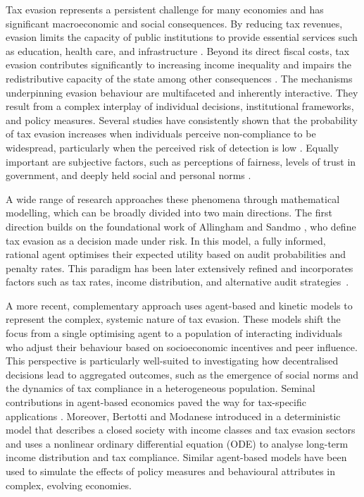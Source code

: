 \documentclass[11pt]{article}
\theoremstyle{plain}
\theoremstyle{definition}
\newcommand{\1}{\mathbf{1}}
\begin{document}
Tax evasion represents a persistent challenge for many economies and has significant macroeconomic and social consequences. By reducing tax revenues, evasion limits the capacity of public institutions to provide essential services such as education, health care, and infrastructure \mbox{\cite{chetty2009taxable, feldstein1995effect}}. Beyond its direct fiscal costs, tax evasion contributes significantly to increasing income inequality and impairs the redistributive capacity of the state among other consequences  \mbox{\cite{andreoni1998tax,biondo2022taxation, kirchler2007economic, slemrod2007cheating,slemrod2002tax, torgler2002speaking}}. The mechanisms underpinning evasion behaviour are multifaceted and inherently interactive. They result from a complex interplay of individual decisions, institutional frameworks, and policy measures. Several studies have consistently shown that the probability of tax evasion increases when individuals perceive non-compliance to be widespread, particularly when the perceived risk of detection is low \cite{dubin2007criminal, mcgee2011ethics, torgler2007tax}. Equally important are subjective factors, such as perceptions of fairness, levels of trust in government, and deeply held social and personal norms \cite{kirchler2007economic, shu2012retracted}.

A wide range of research approaches these phenomena through mathematical modelling, which can be broadly divided into two main directions. The first direction builds on the foundational work of Allingham and Sandmo \cite{allingham1972income}, who define tax evasion as a decision made under risk. In this model, a fully informed, rational agent optimises their expected utility based on audit probabilities and penalty rates. This paradigm has been later extensively refined and incorporates factors such as tax rates, income distribution, and alternative audit strategies~\mbox{\cite{andreoni1998tax,reinganum1985income,yitzhaki1974note}}.

A more recent, complementary approach uses agent-based and kinetic models to represent the complex, systemic nature of tax evasion. These models shift the focus from a single optimising agent to a population of interacting individuals who adjust their behaviour based on socioeconomic incentives and peer influence. This perspective is particularly well-suited to investigating how decentralised decisions lead to aggregated outcomes, such as the emergence of social norms and the dynamics of tax compliance in a heterogeneous population. Seminal contributions in agent-based economics paved the way for tax-specific applications \cite{aoki2004modeling, arthur2018economy}. Moreover, Bertotti and Modanese introduced in \cite{ bertotti2018mathematical,bertotti2014micro} a deterministic model that describes a closed society with income classes and tax evasion sectors and uses a nonlinear ordinary differential equation (ODE) to analyse long-term income distribution and tax compliance. Similar agent-based models \cite{bloomquist2012agent, hokamp2018agent, pickhardt2014behavioral} have been used to simulate the effects of policy measures and behavioural attributes in complex, evolving economies.
\end{document}
